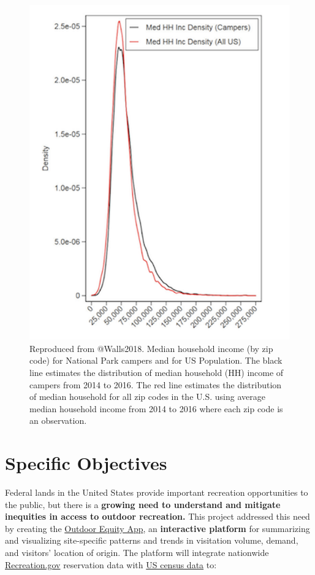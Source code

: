 \documentclass[
]{book}
\begin{document}
\begin{figure}
\includegraphics[width=7.78in]{images/problem_statement_figure_4} \caption{Reproduced from @Walls2018. Median household income (by zip code) for National Park campers and for US Population. The black line estimates the distribution of median household (HH) income of campers from 2014 to 2016. The red line estimates the distribution of median household for all zip codes in the U.S. using average median household income from 2014 to 2016 where each zip code is an observation.}\label{fig:fig4}
\end{figure}

\hypertarget{specific-objectives}{%
\chapter{Specific Objectives}\label{specific-objectives}}

Federal lands in the United States provide important recreation opportunities to the public, but there is a \textbf{growing need to understand and mitigate inequities in access to outdoor recreation.} This project addressed this need by creating the \href{https://shinyapps.bren.ucsb.edu/oe_app/}{Outdoor Equity App}, an \textbf{interactive platform} for summarizing and visualizing site-specific patterns and trends in visitation volume, demand, and visitors' location of origin. The platform will integrate nationwide \href{https://www.recreation.gov/}{Recreation.gov} reservation data with \href{https://www.census.gov/data.html}{US census data} to:
\end{document}
